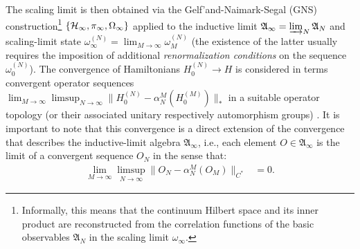\documentclass[a4paper, 11pt]{article}
\newcommand{\fA}{\mathfrak{A}}\newcommand{\cA}{\mathcal{A}}\newcommand{\dA}{\mathds{A}}\newcommand{\sA}{\mathscr{A}}
\DeclareMathOperator{\1}{\mathds{1}}
\begin{document}
The scaling limit is then obtained via the Gelf'and-Naimark-Segal (GNS) construction\footnote{Informally, this means that the continuum Hilbert space and its inner product are reconstructed from the correlation functions of the basic observables $\fA_{N}$ in the scaling limit $\omega_{\infty}$.} $\{\mathcal{H}_{\infty}, \pi_{\infty}, \Omega_{\infty}\}$ applied to the inductive limit $\fA_{\infty} = \varinjlim_{N}\fA_{N}$ and scaling-limit state $\omega^{(N)}_{\infty} = \lim_{M\rightarrow\infty}\omega^{(N)}_{M}$ (the existence of the latter usually requires the imposition of additional \emph{renormalization conditions} on the sequence $\omega^{(N)}_{0}$). The convergence of Hamiltonians $H^{(N)}_{0}\rightarrow H$ is considered in terms convergent operator sequences $\lim_{M\rightarrow\infty}\limsup_{N\rightarrow\infty}\|H^{(N)}_{0}-\alpha^{M}_{N}(H^{(M)}_{0})\|_{*}$ in a suitable operator topology (or their associated unitary respectively automorphism groups) \cite{DuffieldMeanFieldDynamical}. It is important to note that this convergence is a direct extension of the convergence that describes the inductive-limit algebra $\fA_{\infty}$, i.e., each element $O\in\fA_{\infty}$ is the limit of a convergent sequence $O_{N}$ in the sense that:
\begin{align*}
\lim_{M\rightarrow\infty}\limsup_{N\rightarrow\infty}\|O_{N}-\alpha^{M}_{N}(O_{M})\|_{C^{*}} & = 0.
\end{align*}
\end{document}
